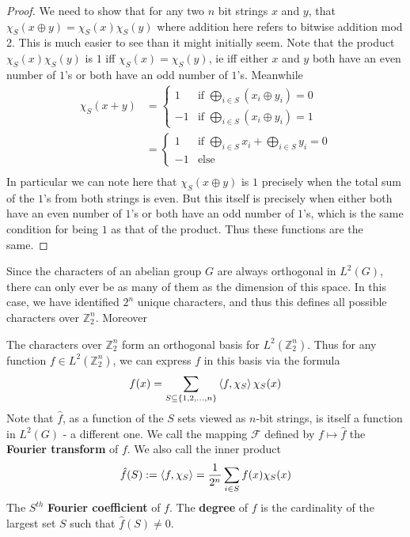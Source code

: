\begin{proof}
	We need to show that for any two $n$ bit strings $x$ and $y$, that $\chi_S(x \oplus y) = \chi_S(x)\chi_S(y)$ where addition here refers to bitwise addition mod 2. This is much easier to see than it might initially seem. Note that the product $\chi_S(x)\chi_S(y)$ is $1$ iff $\chi_S(x) = \chi_S(y)$, ie iff either $x$ and $y$ both have an even number of $1$'s or both have an odd number of $1$'s. Meanwhile 
\begin{align} 
	\chi_S(x+y) &= \begin{cases} 1 & \textrm{if } \bigoplus_{i \in S} (x_i \oplus y_i) = 0  \\
	-1 & \textrm{if } \bigoplus_{i \in S} (x_i \oplus y_i) = 1  \end{cases} \\
	&= \begin{cases} 1 & \textrm{if } \bigoplus_{i \in S} x_i + \bigoplus_{i \in S} y_i = 0 \\
	-1 & \textrm{else} \end{cases} \\
\end{align}
In particular we can note here that $\chi_S(x \oplus y)$ is $1$ precisely when the total sum of the $1$'s from both strings is even. But this itself is precisely when either both have an even number of $1$'s or both have an odd number of $1$'s, which is the same condition for being $1$ as that of the product. Thus these functions are the same. 
\end{proof}
Since the characters of an abelian group $G$ are always orthogonal in $L^2(G)$, there can only ever be as many of them as the dimension of this space. In this case, we have identified $2^n$ unique characters, and thus this defines all possible characters over $\mathbb{Z}_2^n$. Moreover
\begin{definition}
	The characters over $\mathbb{Z}_2^n$ form an orthogonal basis for $L^2(\mathbb{Z}_2^n)$. Thus for any function $f \in L^2(\mathbb{Z}_2^n)$, we can express $f$ in this basis via the formula
	\[ f(x) = \sum_{S \subseteq \{1,2,\ldots,n\}} \braket{f,\chi_S} \chi_S(x) \]
Note that $\hat{f}$, as a function of the $S$ sets viewed as $n$-bit strings, is itself a function in $L^2(G)$ - a different one. We call the mapping $\mathcal{F}$ defined by $f \mapsto \hat{f}$ the \textbf{Fourier transform} of $f$. We also call the inner product 
\[ \hat{f}(S) := \braket{f,\chi_S} = \frac{1}{2^n}\sum_{i \in S} f(x)\chi_S(x) \]
 The $S^{th}$ \textbf{Fourier coefficient} of $f$. The \textbf{degree} of $f$ is the cardinality of the largest set $S$ such that $\hat{f}(S) \neq 0$. 
\end{definition}
